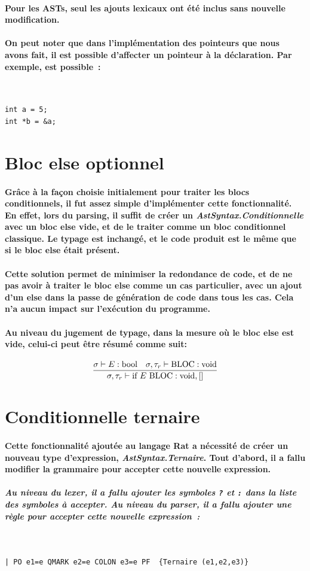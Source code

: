 \documentclass[french]{article}
\newcommand{\jugementElseOpt}{
        \dfrac{\sigma \vdash E : \text{bool} \hspace*{10pt} \sigma, \tau_r \vdash \text{BLOC} : \text{void}}
              {\sigma, \tau_r \vdash \text{if } E \text{ BLOC} : \text{void}, []}
        }
\begin{document}
\paragraph*{Pour les ASTs, seul les ajouts lexicaux ont été inclus sans nouvelle modification.}

\paragraph*{On peut noter que dans l'implémentation des pointeurs que nous avons fait, il est possible d'affecter un pointeur à la déclaration.
Par exemple, est possible~:}
\,
\begin{lstlisting}[language=ratcode]
int a = 5;
int *b = &a;
\end{lstlisting}

\section{Bloc else optionnel}
\paragraph*{Grâce à la façon choisie initialement pour traiter les blocs conditionnels, il fut assez simple d'implémenter cette fonctionnalité.
En effet, lors du parsing, il suffit de créer un \emph{AstSyntax.Conditionnelle} avec un bloc else vide, et de le traiter comme un bloc conditionnel classique.
Le typage est inchangé, et le code produit est le même que si le bloc else était présent.}
\paragraph*{Cette solution permet de minimiser la redondance de code, et de ne pas avoir à traiter le bloc else comme un cas particulier, avec
un ajout d'un else dans la passe de génération de code dans tous les cas. Cela n'a aucun impact sur l'exécution du programme.}
\paragraph*{Au niveau du jugement de typage, dans la mesure où le bloc else est vide, celui-ci peut être résumé comme suit:}
\[\jugementElseOpt\]

\section{Conditionnelle ternaire}
\paragraph*{Cette fonctionnalité ajoutée au langage Rat a nécessité de créer un nouveau type d'expression, \emph{AstSyntax.Ternaire}.
Tout d'abord, il a fallu modifier la grammaire pour accepter cette nouvelle expression.}
\subparagraph*{Au niveau du lexer, il a fallu ajouter les symboles \texttt{?} et \texttt{:} dans la liste des symboles à accepter. Au niveau du parser, il a fallu ajouter une règle pour accepter cette nouvelle expression~:}
\,%
\begin{lstlisting}
| PO e1=e QMARK e2=e COLON e3=e PF  {Ternaire (e1,e2,e3)}
\end{lstlisting}
\end{document}
